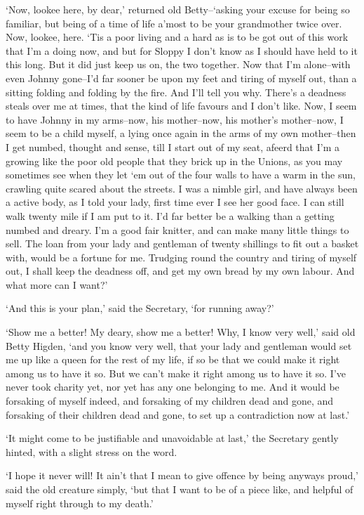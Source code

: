 ‘Now, lookee here, by dear,’ returned old Betty--‘asking your excuse
for being so familiar, but being of a time of life a’most to be your
grandmother twice over. Now, lookee, here. ‘Tis a poor living and a
hard as is to be got out of this work that I’m a doing now, and but for
Sloppy I don’t know as I should have held to it this long. But it did
just keep us on, the two together. Now that I’m alone--with even Johnny
gone--I’d far sooner be upon my feet and tiring of myself out, than a
sitting folding and folding by the fire. And I’ll tell you why. There’s
a deadness steals over me at times, that the kind of life favours and I
don’t like. Now, I seem to have Johnny in my arms--now, his mother--now,
his mother’s mother--now, I seem to be a child myself, a lying once
again in the arms of my own mother--then I get numbed, thought and
sense, till I start out of my seat, afeerd that I’m a growing like the
poor old people that they brick up in the Unions, as you may sometimes
see when they let ‘em out of the four walls to have a warm in the sun,
crawling quite scared about the streets. I was a nimble girl, and have
always been a active body, as I told your lady, first time ever I see
her good face. I can still walk twenty mile if I am put to it. I’d far
better be a walking than a getting numbed and dreary. I’m a good fair
knitter, and can make many little things to sell. The loan from your
lady and gentleman of twenty shillings to fit out a basket with, would
be a fortune for me. Trudging round the country and tiring of myself
out, I shall keep the deadness off, and get my own bread by my own
labour. And what more can I want?’

‘And this is your plan,’ said the Secretary, ‘for running away?’

‘Show me a better! My deary, show me a better! Why, I know very well,’
said old Betty Higden, ‘and you know very well, that your lady and
gentleman would set me up like a queen for the rest of my life, if so be
that we could make it right among us to have it so. But we can’t make it
right among us to have it so. I’ve never took charity yet, nor yet has
any one belonging to me. And it would be forsaking of myself indeed, and
forsaking of my children dead and gone, and forsaking of their children
dead and gone, to set up a contradiction now at last.’

‘It might come to be justifiable and unavoidable at last,’ the Secretary
gently hinted, with a slight stress on the word.

‘I hope it never will! It ain’t that I mean to give offence by being
anyways proud,’ said the old creature simply, ‘but that I want to be of
a piece like, and helpful of myself right through to my death.’


